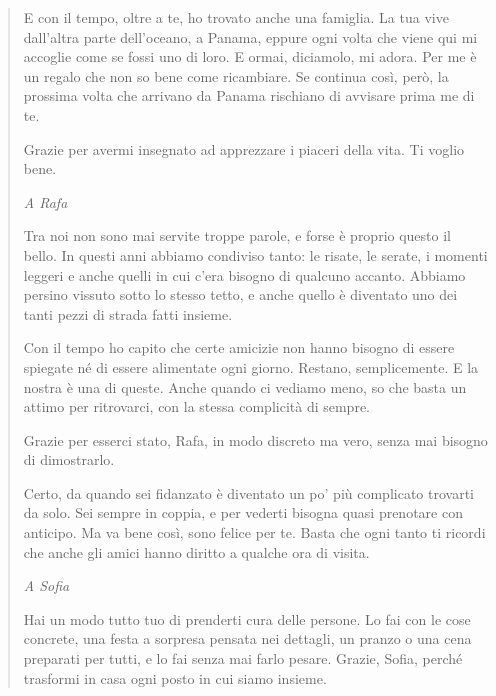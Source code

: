 \begin{quote}
E con il tempo, oltre a te, ho trovato anche una famiglia. La tua vive dall'altra parte dell'oceano, a Panama, eppure ogni volta che viene qui mi accoglie come se fossi uno di loro. E ormai, diciamolo, mi adora. Per me è un regalo che non so bene come ricambiare. Se continua così, però, la prossima volta che arrivano da Panama rischiano di avvisare prima me di te.\par

Grazie per avermi insegnato ad apprezzare i piaceri della vita. Ti voglio bene.\par

\vspace{5mm}
\textit{A Rafa}\par
\vspace{2mm}
Tra noi non sono mai servite troppe parole, e forse è proprio questo il bello. In questi anni abbiamo condiviso tanto: le risate, le serate, i momenti leggeri e anche quelli in cui c'era bisogno di qualcuno accanto. Abbiamo persino vissuto sotto lo stesso tetto, e anche quello è diventato uno dei tanti pezzi di strada fatti insieme.\par

Con il tempo ho capito che certe amicizie non hanno bisogno di essere spiegate né di essere alimentate ogni giorno. Restano, semplicemente. E la nostra è una di queste. Anche quando ci vediamo meno, so che basta un attimo per ritrovarci, con la stessa complicità di sempre.\par

Grazie per esserci stato, Rafa, in modo discreto ma vero, senza mai bisogno di dimostrarlo.\par

Certo, da quando sei fidanzato è diventato un po' più complicato trovarti da solo. Sei sempre in coppia, e per vederti bisogna quasi prenotare con anticipo. Ma va bene così, sono felice per te. Basta che ogni tanto ti ricordi che anche gli amici hanno diritto a qualche ora di visita.\par

\vspace{5mm}
\textit{A Sofia}\par
\vspace{2mm}
Hai un modo tutto tuo di prenderti cura delle persone. Lo fai con le cose concrete, una festa a sorpresa pensata nei dettagli, un pranzo o una cena preparati per tutti, e lo fai senza mai farlo pesare. Grazie, Sofia, perché trasformi in casa ogni posto in cui siamo insieme.\par


\end{quote}
